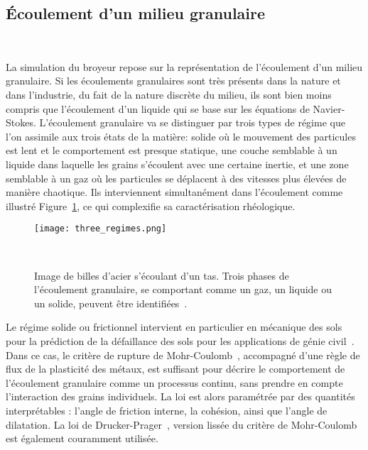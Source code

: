 

\subsection*{Écoulement d'un milieu granulaire}~\label{sec:simu_granulaire}

La simulation du broyeur repose sur la représentation de l'écoulement d'un milieu granulaire. Si les écoulements granulaires sont très présents dans la nature et dans l'industrie, du fait de la nature discrète du milieu, ils sont bien moins compris que l'écoulement d'un liquide qui se base sur les équations de Navier-Stokes. L'écoulement granulaire va se distinguer par trois types de régime que l'on assimile aux trois états de la matière: solide où le mouvement des particules est lent et le comportement est presque statique, une couche semblable à un liquide dans laquelle les grains s'écoulent avec une certaine inertie, et une zone semblable à un gaz où les particules se déplacent à des vitesses plus élevées de manière chaotique. Ils interviennent simultanément dans l'écoulement comme illustré Figure~\ref{fig:forterre_flows}, ce qui complexifie sa caractérisation rhéologique.
\begin{figure}
    \centering
    \texttt{[image: three\_regimes.png]}
    \caption{Image de billes d'acier s'écoulant d'un tas. Trois phases de l'écoulement granulaire, se comportant comme un gaz, un liquide ou un solide, peuvent être identifiées~\cite{forterre_flows_2008}.}~\label{fig:forterre_flows}
\end{figure}

Le régime solide ou frictionnel intervient en particulier en mécanique des sols pour la prédiction de la défaillance des sols pour les applications de génie civil~\cite{Campbell2006}. Dans ce cas, le critère de rupture de Mohr-Coulomb~\cite{Juvinal1991}, accompagné d'une règle de flux de la plasticité des métaux, est suffisant pour décrire le comportement de l'écoulement granulaire comme un processus continu, sans prendre en compte l'interaction des grains individuels. La loi est alors paramétrée par des quantités interprétables : l'angle de friction interne, la cohésion, ainsi que l'angle de dilatation. La loi de Drucker-Prager~\cite{Drucker1952}, version lissée du critère de Mohr-Coulomb est également couramment utilisée.


